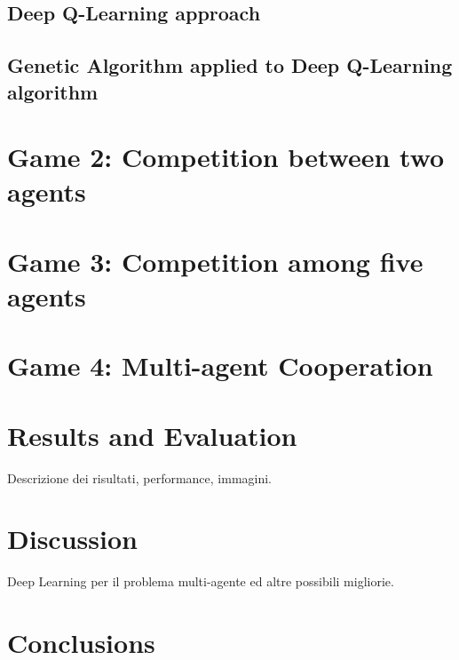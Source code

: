 \subsection{Deep Q-Learning approach}


\subsection{Genetic Algorithm applied to Deep Q-Learning algorithm}

\section{Game 2: Competition between two agents}


\section{Game 3: Competition among five agents}

\section{Game 4: Multi-agent Cooperation}

\section{Results and Evaluation}
Descrizione dei risultati, performance, immagini.

\section{Discussion}
Deep Learning per il problema multi-agente ed altre possibili migliorie.


\section{Conclusions}





